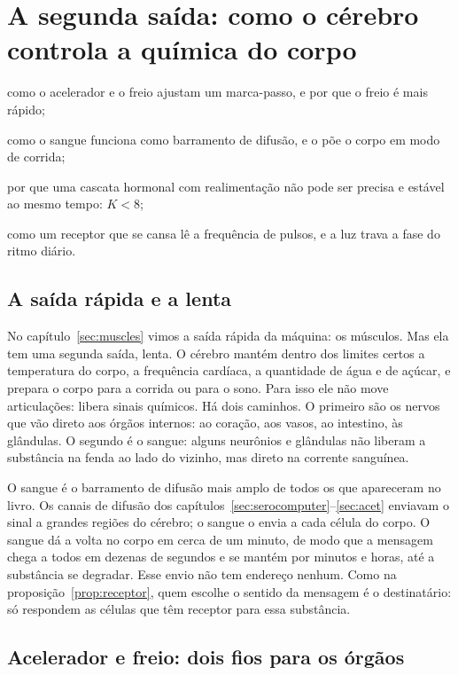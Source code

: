 \chapter{A segunda saída: como o cérebro controla a química do corpo}
\label{sec:chemoutput}
\begin{chaptergoals}
\item como o acelerador  e o freio  ajustam um marca-passo, e por que o freio é mais rápido;
\item como o sangue funciona como barramento de difusão, e o  põe o corpo em modo de corrida;
\item por que uma cascata hormonal com realimentação não pode ser precisa e estável ao mesmo tempo: $K<8$;
\item como um receptor que se cansa lê a frequência de pulsos, e a luz trava a fase do ritmo diário.
\end{chaptergoals}

\section{A saída rápida e a lenta}

No capítulo~\ref{sec:muscles} vimos a saída rápida da máquina: os músculos. Mas ela tem uma segunda saída, lenta. O cérebro mantém dentro dos limites certos a temperatura do corpo, a frequência cardíaca, a quantidade de água e de açúcar, e prepara o corpo para a corrida ou para o sono. Para isso ele não move articulações: libera sinais químicos. Há dois caminhos. O primeiro são os nervos que vão direto aos órgãos internos: ao coração, aos vasos, ao intestino, às glândulas. O segundo é o sangue: alguns neurônios e glândulas não liberam a substância na fenda ao lado do vizinho, mas direto na corrente sanguínea.

O sangue é o barramento de difusão mais amplo de todos os que apareceram no livro. Os canais de difusão dos capítulos~\ref{sec:serocomputer}--\ref{sec:acet} enviavam o sinal a grandes regiões do cérebro; o sangue o envia a cada célula do corpo. O sangue dá a volta no corpo em cerca de um minuto, de modo que a mensagem chega a todos em dezenas de segundos e se mantém por minutos e horas, até a substância se degradar. Esse envio não tem endereço nenhum. Como na proposição~\ref{prop:receptor}, quem escolhe o sentido da mensagem é o destinatário: só respondem as células que têm receptor para essa substância.

\section{Acelerador e freio: dois fios para os órgãos}


